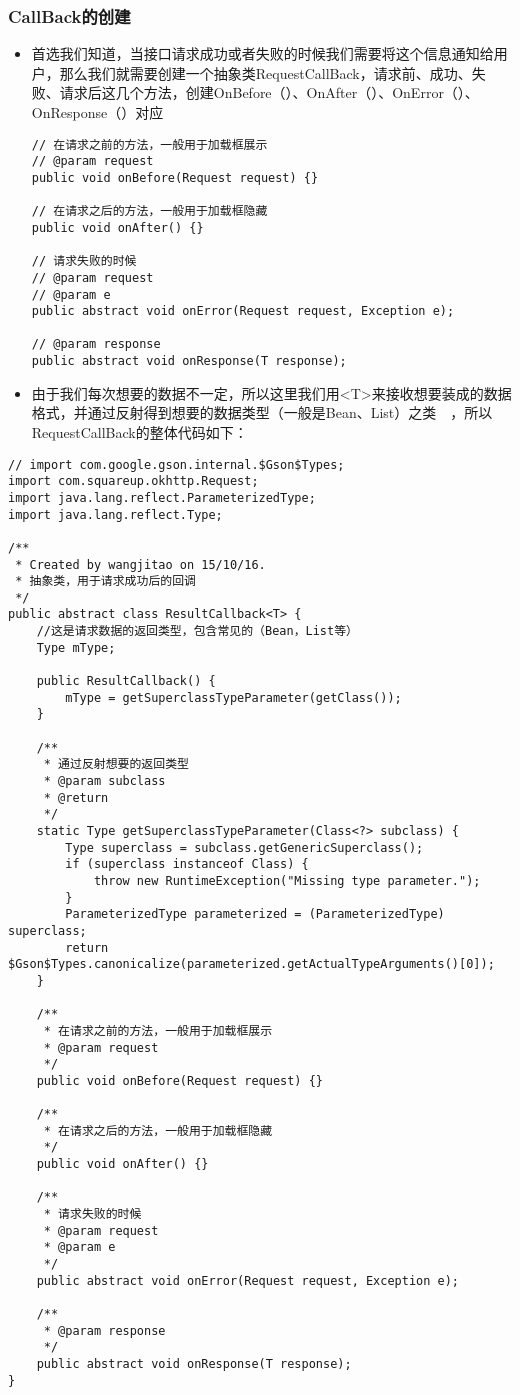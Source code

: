 \documentclass[9pt, b5paper]{article}
\begin{document}
\subsubsection{CallBack的创建　　}
\label{sec-13-3-1}
\begin{itemize}
\item 首选我们知道，当接口请求成功或者失败的时候我们需要将这个信息通知给用户，那么我们就需要创建一个抽象类RequestCallBack，请求前、成功、失败、请求后这几个方法，创建OnBefore（）、OnAfter（）、OnError（）、OnResponse（）对应
\begin{verbatim}
// 在请求之前的方法，一般用于加载框展示
// @param request
public void onBefore(Request request) {}
 
// 在请求之后的方法，一般用于加载框隐藏
public void onAfter() {}
 
// 请求失败的时候
// @param request
// @param e
public abstract void onError(Request request, Exception e);
 
// @param response
public abstract void onResponse(T response);
\end{verbatim}
\item 由于我们每次想要的数据不一定，所以这里我们用<T>来接收想要装成的数据格式，并通过反射得到想要的数据类型（一般是Bean、List）之类　，所以RequestCallBack的整体代码如下：
\end{itemize}
\begin{verbatim}
// import com.google.gson.internal.$Gson$Types;
import com.squareup.okhttp.Request;
import java.lang.reflect.ParameterizedType;
import java.lang.reflect.Type;
 
/**
 * Created by wangjitao on 15/10/16.
 * 抽象类，用于请求成功后的回调
 */
public abstract class ResultCallback<T> {
    //这是请求数据的返回类型，包含常见的（Bean，List等）
    Type mType;
 
    public ResultCallback() {
        mType = getSuperclassTypeParameter(getClass());
    }
 
    /**
     * 通过反射想要的返回类型
     * @param subclass
     * @return
     */
    static Type getSuperclassTypeParameter(Class<?> subclass) {
        Type superclass = subclass.getGenericSuperclass();
        if (superclass instanceof Class) {
            throw new RuntimeException("Missing type parameter.");
        }
        ParameterizedType parameterized = (ParameterizedType) superclass;
        return $Gson$Types.canonicalize(parameterized.getActualTypeArguments()[0]);
    }
 
    /**
     * 在请求之前的方法，一般用于加载框展示
     * @param request
     */
    public void onBefore(Request request) {}
 
    /**
     * 在请求之后的方法，一般用于加载框隐藏
     */
    public void onAfter() {}
 
    /**
     * 请求失败的时候
     * @param request
     * @param e
     */
    public abstract void onError(Request request, Exception e);
 
    /**
     * @param response
     */
    public abstract void onResponse(T response);
}
\end{verbatim}
\end{document}
